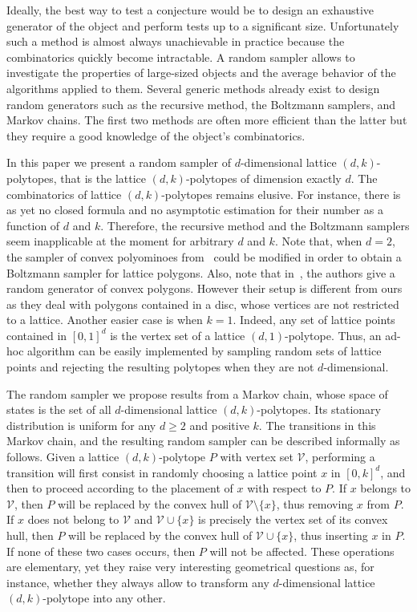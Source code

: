 \documentclass[a4paper]{article}
\begin{document}
Ideally, the best way to test a conjecture would be to design an exhaustive generator of the object and perform tests up to a significant size. Unfortunately such a method is almost always unachievable in practice because the combinatorics quickly become intractable. A random sampler allows to investigate the properties of large-sized objects and the average behavior of the algorithms applied to them. Several generic methods already exist to design random generators such as the recursive method, the Boltzmann samplers, and Markov chains. The first two methods are often more efficient than the latter but they require a good knowledge of the object's combinatorics.

In this paper we present a random sampler of $d$-dimensional lattice $(d,k)$-polytopes, that is the lattice $(d,k)$-polytopes of dimension exactly $d$. The combinatorics of lattice $(d,k)$-polytopes remains elusive. For instance, there is as yet no closed formula and no asymptotic estimation for their number as a function of $d$ and $k$. Therefore, the recursive method and the Boltzmann samplers seem inapplicable at the moment for arbitrary $d$ and $k$. Note that, when $d=2$, the sampler of convex polyominoes from~\cite{bodini2013asymptotic} could be modified in order to obtain a Boltzmann sampler for lattice polygons. Also, note that in~\cite{devillers2014generator}, the authors give a random generator of convex polygons. However their setup is different from ours as they deal with polygons contained in a disc, whose vertices are not restricted to a lattice. Another easier case is when $k=1$. Indeed, any set of lattice points contained in $[0,1]^d$
is the vertex set of a lattice $(d,1)$-polytope. Thus, an ad-hoc algorithm can be easily implemented by sampling random sets of lattice points and rejecting the resulting polytopes when they are not $d$-dimensional.

The random sampler we propose results from a Markov chain, whose space of states is the set of all $d$-dimensional lattice $(d,k)$-polytopes. Its stationary distribution is uniform for any $d\geq{2}$ and positive $k$. The transitions in this Markov chain, and the resulting random sampler can be described informally as follows. Given a lattice $(d,k)$-polytope $P$ with vertex set $\mathcal{V}$, performing a transition will first consist in randomly choosing a lattice point $x$ in $[0,k]^d$, and then to proceed according to the placement of $x$ with respect to $P$. If $x$ belongs to $\mathcal{V}$, then $P$ will be replaced by the convex hull of $\mathcal{V}\mathord{\setminus}\{x\}$, thus removing $x$ from $P$. If $x$ does not belong to $\mathcal{V}$ and $\mathcal{V}\cup\{x\}$
is precisely the vertex set of its convex hull, then $P$ will be replaced by the convex hull of $\mathcal{V}\cup\{x\}$, thus inserting $x$ in $P$. If none of these two cases occurs, then $P$ will not be affected. These operations are elementary, yet they raise very interesting geometrical questions as, for instance, whether they always allow to transform any $d$-dimensional lattice $(d,k)$-polytope into any other.
\end{document}
